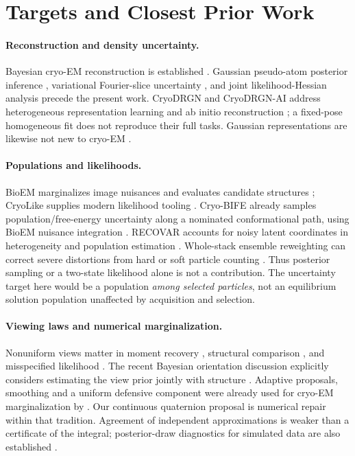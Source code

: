 \documentclass{article}
\begin{document}
\section{Targets and Closest Prior Work}
\label{sec:prior}
\paragraph{Reconstruction and density uncertainty.}
Bayesian cryo-EM reconstruction is established \citep{scheres2012}.
Gaussian pseudo-atom posterior inference \citep{joubert2015}, variational
Fourier-slice uncertainty \citep{ullrich2020}, and joint likelihood-Hessian
analysis \citep{rangan2024} precede the present work. CryoDRGN and
CryoDRGN-AI address heterogeneous representation learning and ab initio
reconstruction \citep{zhong2021,drgnai2025}; a fixed-pose homogeneous fit
does not reproduce their full tasks. Gaussian representations are likewise
not new to cryo-EM \citep{chen2021,chen2025,qu2025,shekar2025}.

\paragraph{Populations and likelihoods.}
BioEM marginalizes image nuisances and evaluates candidate structures
\citep{bioem2013}; CryoLike supplies modern likelihood tooling
\citep{cryolike2025}. Cryo-BIFE already samples population/free-energy
uncertainty along a nominated conformational path, using BioEM nuisance
integration \citep{cryobife2021}. RECOVAR accounts for noisy latent
coordinates in heterogeneity and population estimation \citep{recovar2025}.
Whole-stack ensemble reweighting can correct severe distortions from hard
or soft particle counting \citep{counting2026}. Thus posterior sampling or
a two-state likelihood alone is not a contribution. The uncertainty target
here would be a population \emph{among selected particles}, not an equilibrium
solution population unaffected by acquisition and selection.

\paragraph{Viewing laws and numerical marginalization.}
Nonuniform views matter in moment recovery \citep{sharon2020,subspacemom2026},
structural comparison \citep{momentmetrics2024}, and misspecified likelihood
\citep{nonuniformmle2025}. The recent Bayesian orientation discussion
explicitly considers estimating the view prior jointly with structure
\citep{bayespose2026}. Adaptive proposals, smoothing and a uniform defensive
component were already used for cryo-EM marginalization by
\citet{brubaker2015}. Our continuous quaternion proposal is numerical repair
within that tradition. Agreement of independent approximations is weaker
than a certificate of the integral; posterior-draw diagnostics for simulated
data are also established \citep{grosse2015}.
\end{document}
